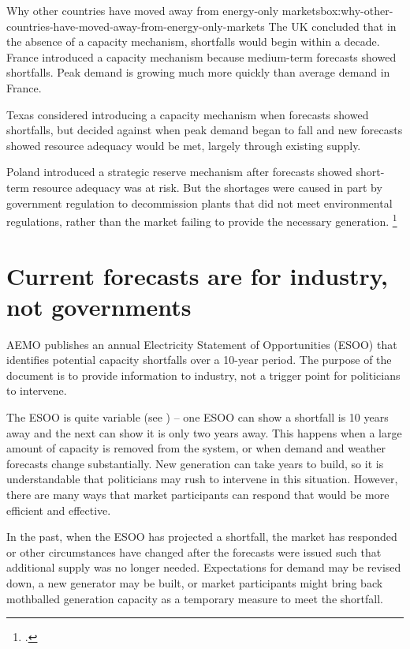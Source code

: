 \documentclass[FrontPage]{grattan}
\newenvironment{alphafootnotes}{}{}
\begin{document}
\begin{bigbox*}{Why other countries have moved away from energy-only markets}{box:why-other-countries-have-moved-away-from-energy-only-markets}
\begin{alphafootnotes}
The UK concluded that in the absence of a capacity mechanism, shortfalls would begin within a decade. France introduced a capacity mechanism because medium-term forecasts showed shortfalls. Peak demand is growing much more quickly than average demand in France.

Texas considered introducing a capacity mechanism when forecasts showed shortfalls, but decided against when peak demand began to fall and new forecasts showed resource adequacy would be met, largely through existing supply.

Poland introduced a strategic reserve mechanism after forecasts showed short-term resource adequacy was at risk. But the shortages were caused in part by government regulation to decommission plants that did not meet environmental regulations, rather than the market failing to provide the necessary generation.%
\footcite{CIGRE2016CapacityMechanisms}

\end{alphafootnotes}
\end{bigbox*}

\section{Current forecasts are for industry, not governments}\label{sec:current-forecasts-for-industry-not-governments}
AEMO publishes an annual Electricity Statement of Opportunities (ESOO) that identifies potential capacity shortfalls over a 10-year period. The purpose of the document is to provide information to industry, not a trigger point for politicians to intervene.

The ESOO is quite variable (see ) -- one ESOO can show a shortfall is 10 years away and the next can show it is only two years away. This happens when a large amount of capacity is removed from the system, or when demand and weather forecasts change substantially. New generation can take years to build, so it is understandable that politicians may rush to intervene in this situation. However, there are many ways that market participants can respond that would be more efficient and effective.

In the past, when the ESOO has projected a shortfall, the market has responded or other circumstances have changed after the forecasts were issued such that additional supply was no longer needed. Expectations for demand may be revised down, a new generator may be built, or market participants might bring back mothballed generation capacity as a temporary measure to meet the shortfall.
\end{document}
